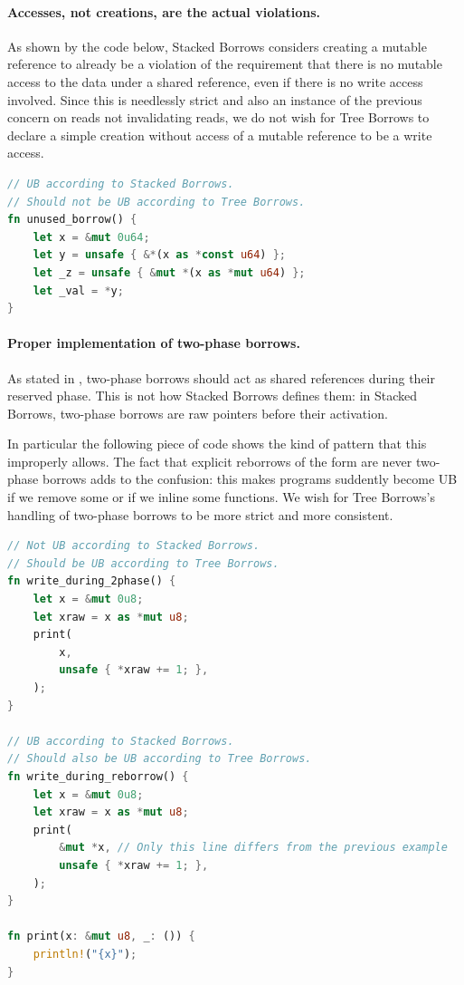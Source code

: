 \documentclass[a4paper,11pt]{article}
\theoremstyle{plain}
\theoremstyle{definition}
\theoremstyle{remark}
\newcommand{\tcode}[1]{\rstinline{#1}}
\begin{document}
\paragraph*{Accesses, not creations, are the actual violations.}
As shown by the code below, Stacked Borrows considers creating a mutable reference
to already be a violation of the requirement that there is no mutable access to
the data under a shared reference, even if there is no write access involved.
Since this is needlessly strict and also an instance of the previous concern on
reads not invalidating reads, we do not wish for Tree Borrows to declare a simple
creation without access of a mutable reference to be a write access.
\begin{lstlisting}[language=rust]
// UB according to Stacked Borrows.
// Should not be UB according to Tree Borrows.
fn unused_borrow() {
    let x = &mut 0u64;
    let y = unsafe { &*(x as *const u64) };
    let _z = unsafe { &mut *(x as *mut u64) };
    let _val = *y;
}
\end{lstlisting}

\paragraph*{Proper implementation of two-phase borrows.}
As stated in \cite{rustc_dev_guide}, two-phase borrows should act as shared references
during their reserved phase. This is not how Stacked Borrows defines them: in
Stacked Borrows, two-phase borrows are raw pointers before their activation.

In particular the following piece of code shows the kind of pattern that this
improperly allows. The fact that explicit reborrows of the form \tcode{\&mut *x}
are never two-phase borrows adds to the confusion: this makes programs suddently
become UB if we remove some \tcode{\&mut*} or if we inline some functions.
We wish for Tree Borrows's handling of two-phase borrows to be more strict and
more consistent.
\begin{lstlisting}[language=rust]
// Not UB according to Stacked Borrows.
// Should be UB according to Tree Borrows.
fn write_during_2phase() {
    let x = &mut 0u8;
    let xraw = x as *mut u8;
    print(
        x,
        unsafe { *xraw += 1; },
    );
}

// UB according to Stacked Borrows.
// Should also be UB according to Tree Borrows.
fn write_during_reborrow() {
    let x = &mut 0u8;
    let xraw = x as *mut u8;
    print(
        &mut *x, // Only this line differs from the previous example
        unsafe { *xraw += 1; },
    );
}

fn print(x: &mut u8, _: ()) {
    println!("{x}");
}
\end{lstlisting}
\end{document}
